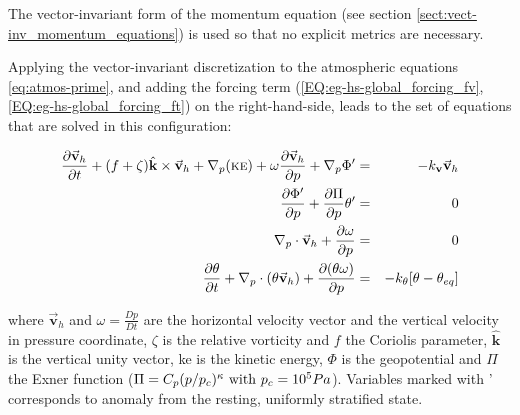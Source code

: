 The vector-invariant form of the momentum equation (see section
\ref{sect:vect-inv_momentum_equations}) is used so that no explicit 
metrics are necessary.

Applying the vector-invariant discretization to the
atmospheric equations \ref{eq:atmos-prime}, and adding the 
forcing term 
(\ref{EQ:eg-hs-global_forcing_fv}, \ref{EQ:eg-hs-global_forcing_ft})
on the right-hand-side,
leads to the set of equations that are solved in this configuration:


\begin{eqnarray}
\label{EQ:eg-hs-model_equations}
\frac{\partial \vec{\mathbf{v}}_h}{\partial t}
+(f + \zeta)\hat{\mathbf{k}} \times \vec{\mathbf{v}}_h
+\mathbf{\nabla }_{p} (\mbox{\sc ke})
+ \omega \frac{\partial \vec{\mathbf{v}}_h }{\partial p}
+\mathbf{\nabla }_p \Phi ^{\prime } 
&=& 
-k_\mathbf{v}\vec{\mathbf{v}}_h
\\
\frac{\partial \Phi ^{\prime }}{\partial p} 
+\frac{\partial \Pi }{\partial p}\theta ^{\prime } &=&0
\\
\mathbf{\nabla }_{p}\cdot \vec{\mathbf{v}}_h+\frac{\partial \omega }{
\partial p} &=&0
\\
\frac{\partial \theta }{\partial t} 
+ \mathbf{\nabla }_{p}\cdot (\theta \vec{\mathbf{v}}_h)
+ \frac{\partial (\theta \omega)}{\partial p}
&=& -k_{\theta}[\theta-\theta_{eq}]
\end{eqnarray}


\noindent where $\vec{\mathbf{v}}_h$ and $\omega = \frac{Dp}{Dt}$ 
are the horizontal velocity vector and the vertical velocity in pressure coordinate,
$\zeta$ is the relative vorticity and $f$ the Coriolis parameter, 
$\hat{\mathbf{k}}$ is the vertical unity vector, 
{\sc ke} is the kinetic energy, $\Phi$ is the geopotential
and $\Pi$ the Exner function 
($\Pi = C_p (p/p_c)^\kappa ~{\rm with}~ p_c = 10^5 Pa$).
Variables marked with ' corresponds to anomaly from 
the resting, uniformly stratified state.

